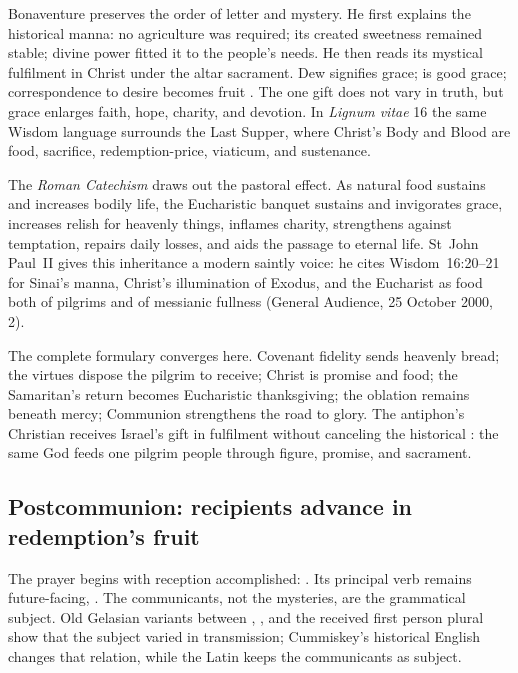 Bonaventure preserves the order of letter and mystery. He first explains the
historical manna: no agriculture was required; its created sweetness remained
stable; divine power fitted it to the people's needs. He then reads its mystical
fulfilment in Christ under the altar sacrament. Dew signifies grace;
 is good grace; correspondence to desire becomes fruit
. The one gift does not vary in
truth, but grace enlarges faith, hope, charity, and devotion. In \emph{Lignum
vitae} 16 the same Wisdom language surrounds the Last Supper, where Christ's
Body and Blood are food, sacrifice, redemption-price, viaticum, and sustenance.

The \emph{Roman Catechism} draws out the pastoral effect. As natural food
sustains and increases bodily life, the Eucharistic banquet sustains and
invigorates grace, increases relish for heavenly things, inflames charity,
strengthens against temptation, repairs daily losses, and aids the passage to
eternal life. St~John Paul~II gives this inheritance a modern saintly voice:
he cites Wisdom~16:20--21 for Sinai's manna, Christ's illumination of Exodus,
and the Eucharist as food both of pilgrims and of messianic fullness (General
Audience, 25 October 2000, 2).

The complete formulary converges here. Covenant fidelity sends heavenly bread;
the virtues dispose the pilgrim to receive; Christ is promise and food; the
Samaritan's return becomes Eucharistic thanksgiving; the oblation remains
beneath mercy; Communion strengthens the road to glory. The antiphon's
Christian  receives Israel's gift in fulfilment without canceling
the historical : the same God feeds one pilgrim people through
figure, promise, and sacrament.

\subsection*{Postcommunion: recipients advance in redemption's fruit\enspace{}}

The prayer begins with reception accomplished: . Its principal verb remains future-facing, .
The communicants, not the mysteries, are the grammatical subject. Old Gelasian
variants between , , and the received first
person plural show that the subject varied in transmission; Cummiskey's
historical English changes that relation, while the Latin keeps the
communicants as subject.


